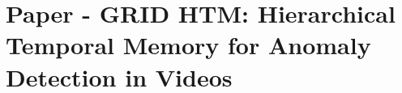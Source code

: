 \documentclass[USenglish]{ifimaster}  %
\begin{document}
\tableofcontents
\listoffigures
\listoftables

\mainmatter





\backmatter{}
\printbibliography

\appendix
\chapter{Paper - GRID HTM: Hierarchical Temporal Memory for Anomaly Detection in Videos}
\label{appendix:paper}

\end{document}
